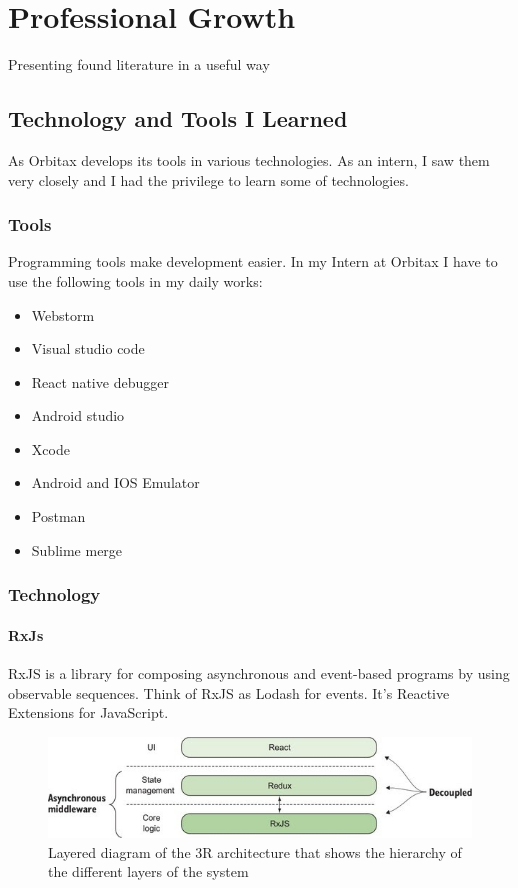\chapter{Professional Growth}
\begin{flushleft}


\label{ch:results}

Presenting found literature in a useful way

\section{Technology and Tools I Learned}
As Orbitax develops its tools in various technologies. As an intern, I saw them very closely and I had the privilege to learn some of technologies. 


\subsection{Tools}
Programming tools make development easier. In my Intern at Orbitax I have to use the following tools in my daily works:

\begin{itemize}
    \item Webstorm
    \item Visual studio code
    \item React native debugger
    \item Android studio
    \item Xcode
    \item Android and IOS Emulator
    \item Postman
    \item Sublime merge
\end{itemize}

\subsection{Technology}
\subsubsection{RxJs}
RxJS is a library for composing asynchronous and event-based programs by using observable sequences. Think of RxJS as Lodash for events. It’s Reactive Extensions for JavaScript.

 \begin{figure}[htbp]
\centerline{\includegraphics[scale=0.5]{Figures/react.jpg}}
\caption{Layered diagram of the 3R architecture that shows the hierarchy of the different layers of the system}
\label{fig}
\end{figure}


\end{flushleft}
